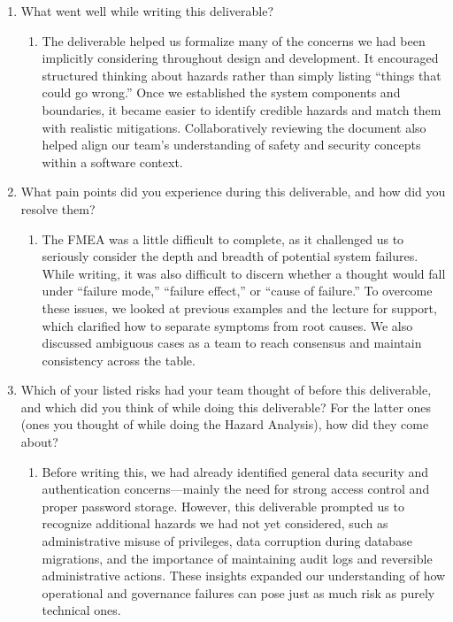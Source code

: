 \documentclass{article}
\begin{document}
\begin{enumerate}
    \item What went well while writing this deliverable? 
    \begin{enumerate}
        \item The deliverable helped us formalize many of the concerns we had been implicitly considering throughout design and development. It encouraged structured thinking about hazards rather than simply listing “things that could go wrong.” Once we established the system components and boundaries, it became easier to identify credible hazards and match them with realistic mitigations. Collaboratively reviewing the document also helped align our team’s understanding of safety and security concepts within a software context.
    \end{enumerate}
    \item What pain points did you experience during this deliverable, and how
    did you resolve them?
    \begin{enumerate}
        \item The FMEA was a little difficult to complete, as it challenged us to seriously consider the depth and breadth of potential system failures. While writing, it was also difficult to discern whether a thought would fall under “failure mode,” “failure effect,” or “cause of failure.” To overcome these issues, we looked at previous examples and the lecture for support, which clarified how to separate symptoms from root causes. We also discussed ambiguous cases as a team to reach consensus and maintain consistency across the table.
    \end{enumerate}
    \item Which of your listed risks had your team thought of before this
    deliverable, and which did you think of while doing this deliverable? For
    the latter ones (ones you thought of while doing the Hazard Analysis), how
    did they come about?
    \begin{enumerate}
        \item Before writing this, we had already identified general data security and authentication concerns—mainly the need for strong access control and proper password storage. However, this deliverable prompted us to recognize additional hazards we had not yet considered, such as administrative misuse of privileges, data corruption during database migrations, and the importance of maintaining audit logs and reversible administrative actions. These insights expanded our understanding of how operational and governance failures can pose just as much risk as purely technical ones.

\end{enumerate}
\end{enumerate}
\end{document}
